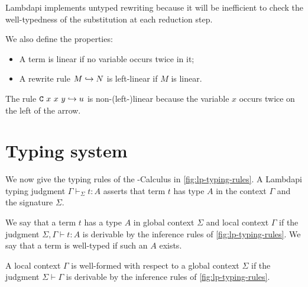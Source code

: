 Lambdapi implements untyped rewriting because it will be inefficient to check the well-typedness of the substitution at each reduction step.

\begin{definition}[Linearity]
We also define the properties:
\begin{itemize}
\item A term is linear if no variable occurs twice in it;
\item A rewrite rule $M \hookrightarrow N$ is left-linear if $M$ is linear.
\end{itemize}
\end{definition}

\begin{example}
The rule $\texttt{\upshape{C}}~x~x~y\hookrightarrow u$ is non-(left-)linear because the variable $x$ occurs twice on the left of the arrow.
\end{example}

\section{Typing system}
\label{sect:lambdapi}

We now give the typing rules of the \lpm{}-Calculus in \cref{fig:lp-typing-rules}.
A Lambdapi typing judgment $\Gamma \vdash_\Sigma t : A$ asserts that term $t$ has type $A$ in the context $\Gamma$ and the signature $\Sigma$.


\begin{definition}
We say that a term $t$ has a type $A$ in global context $\Sigma$ and local context $\Gamma$ if the judgment $\Sigma,\Gamma \vdash t: A$ is
derivable by the inference rules of \cref{fig:lp-typing-rules}. We say that a term is well-typed if such an $A$ exists.
\end{definition}

\begin{definition}
A local context $\Gamma$ is well-formed with respect to a global context $\Sigma$ if the judgment $\Sigma \vdash \Gamma$ is derivable by the inference rules of \cref{fig:lp-typing-rules}.
\end{definition}


